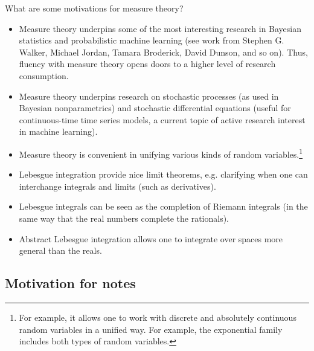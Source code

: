 \documentclass{article} %
\begin{document}
What are some motivations for measure theory?

\begin{itemize}
\item Measure theory underpins some of the most interesting research in Bayesian statistics and probabilistic machine learning (see work from Stephen G. Walker, Michael Jordan, Tamara Broderick, David Dunson, and so on).   Thus, fluency with measure theory opens doors to a higher level of research consumption. 
\item Measure theory underpins research on stochastic processes (as used in Bayesian nonparametrics) and stochastic differential equations (useful for continuous-time time series models, a current topic of active research interest in machine learning). 
\item Measure theory is convenient in unifying various kinds of random variables.\footnote{For example, it allows one to work with discrete and absolutely continuous random variables in a unified way.  For example, the exponential family includes both types of random variables.}
\item Lebesgue integration provide nice limit theorems, e.g. clarifying when one can interchange integrals and limits (such as derivatives).   
\item Lebesgue integrals can be seen as the completion of Riemann integrals (in the same way that the real numbers complete the rationals).
\item Abstract Lebesgue integration allows one to integrate over spaces more general than the reals. 

\end{itemize}



\subsection{Motivation for notes}
\end{document}
